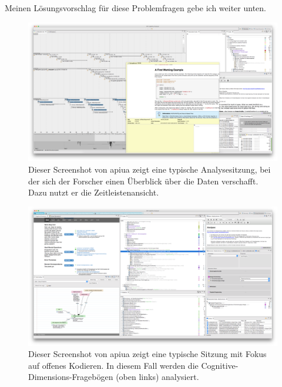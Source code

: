 \begin{description}
  Meinen Lösungsvorschlag für diese Problemfragen gebe ich weiter unten. 
\end{description}

\begin{figure}
  \centering
    \includegraphics[width=1.0\linewidth]{Figures/apiua/browsing.png}
  \caption[APIUA: Exploration]{Dieser Screenshot von \gls{apiua} zeigt eine typische Analysesitzung, bei der sich der Forscher einen Überblick über die Daten verschafft. Dazu nutzt er die Zeitleistenansicht.}
  \label{fig:apiua-browsing}
\end{figure}

\begin{figure}
  \centering
    \includegraphics[width=1.0\linewidth]{Figures/apiua/opencoding-cd.png}
  \caption[APIUA: Cognitive Dimensions]{Dieser Screenshot von \gls{apiua} zeigt eine typische Sitzung mit Fokus auf offenes Kodieren. In diesem Fall werden die Cognitive-Dimensions-Fragebögen (oben links) analysiert.}
  \label{fig:apiua-opencoding-cd}
\end{figure}

